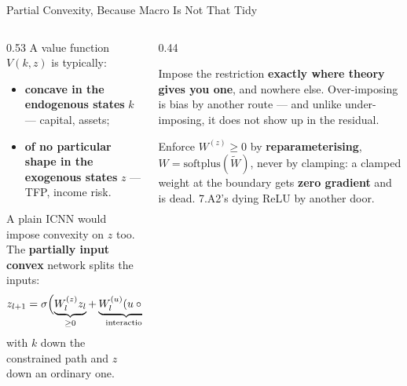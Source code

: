\begin{frame}{Partial Convexity, Because Macro Is Not That Tidy}
\begin{columns}[T]
\begin{column}{0.53\textwidth}
\small
A value function $V(k,z)$ is typically:
\begin{itemize}\small\setlength{\itemsep}{0.5mm}
  \item \textbf{concave in the endogenous states} $k$ --- capital, assets;
  \item \textbf{of no particular shape in the exogenous states} $z$ --- TFP, income risk.
\end{itemize}
\medskip

A plain ICNN would impose convexity on $z$ too. The \textbf{partially input convex} network splits the inputs:
\[
  z_{l+1}=\sigma\Bigl(\underbrace{W^{(z)}_l z_l}_{\ge0}+\underbrace{W^{(u)}_l(u\circ v)}_{\text{interaction}}+\underbrace{W^{(v)}_l v}_{\text{free}}+b_l\Bigr),
\]
with $k$ down the constrained path and $z$ down an ordinary one.
\end{column}
\begin{column}{0.44\textwidth}
\begin{takeawaybox}[title=\textbf{The general principle}]\small
Impose the restriction \textbf{exactly where theory gives you one}, and nowhere else. Over-imposing is bias by another route --- and unlike under-imposing, it does not show up in the residual.
\end{takeawaybox}
\smallskip
\begin{cautionbox}[title=\textbf{Softplus, not clamp}]\footnotesize
Enforce $W^{(z)}\ge0$ by \textbf{reparameterising}, $W=\mathrm{softplus}(\tilde W)$, never by clamping: a clamped weight at the boundary gets \textbf{zero gradient} and is dead. 7.A2's dying ReLU by another door.
\end{cautionbox}
\end{column}
\end{columns}
\end{frame}

